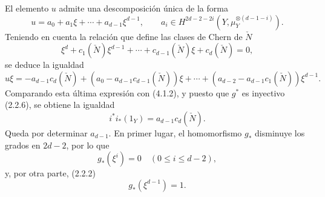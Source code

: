 El elemento $u$ admite una descomposición única de la forma
\[
u=a_0+a_1\xi+\cdots+a_{d-1}\xi^{d-1},
\qquad
a_i\in H^{2d-2-2i}(Y,\mu_Y^{\otimes(d-1-i)}).
\tag{4.1.3}
\]
Teniendo en cuenta la relación que define las clases de Chern de $\check N$
\[
\xi^d+c_1(\check N)\xi^{d-1}+\cdots+c_{d-1}(\check N)\xi+c_d(\check N)=0,
\tag{4.1.4}
\]
se deduce la igualdad
\[
u\xi=-a_{d-1}c_d(\check N)+(a_0-a_{d-1}c_{d-1}(\check N))\xi
+\cdots+(a_{d-2}-a_{d-1}c_1(\check N))\xi^{d-1}.
\]
Comparando esta última expresión con (4.1.2), y puesto que $g^*$ es inyectivo (2.2.6), se obtiene la igualdad
\[
i^*i_*(1_Y)=a_{d-1}c_d(\check N).
\tag{4.1.5}
\]
Queda por determinar $a_{d-1}$. En primer lugar, el homomorfismo $g_*$ disminuye los grados en $2d-2$, por lo que
\[
g_*(\xi^i)=0\quad(0\le i\le d-2),
\]
y, por otra parte, (2.2.2)
\[
g_*(\xi^{d-1})=1.
\]
